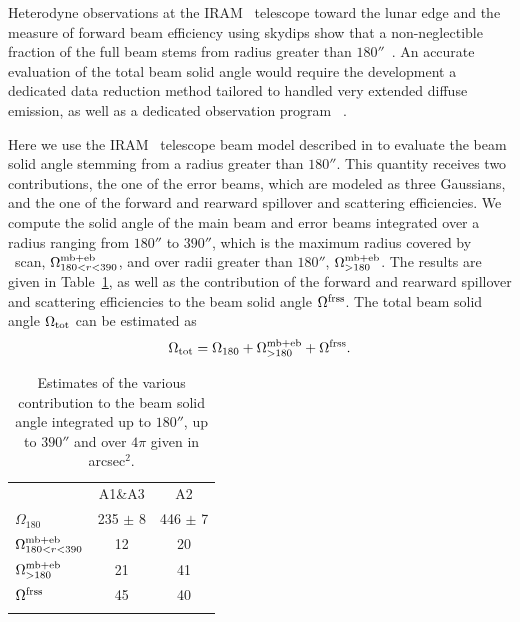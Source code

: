 Heterodyne observations at the IRAM \trentemetre\ telescope
toward the lunar edge and the measure of forward beam efficiency using
skydips show that a non-neglectible fraction of the full beam stems
from radius greater than $180''$~\citep{Greve1998, Kramer2013}.
An accurate evaluation of the total beam solid angle would require
{\lp the development a dedicated data reduction method tailored to
handled very extended diffuse emission,} as well as a 
dedicated observation program
~\citep{Greve1998, Sugimoto2004, Gusten2006}.
{\lp Here we use the IRAM \trentemetre\ telescope beam model described
in \citet{Kramer2013} to evaluate the beam solid angle stemming from a
radius greater than $180''$.
This quantity receives two contributions, the one of the error beams,
which are modeled as three Gaussians, and the one of the forward and
rearward spillover and scattering efficiencies. We compute the solid
angle of the main beam and error beams integrated over a radius ranging
from $180''$ to $390''$, which is the maximum radius covered by \bm\ scan,
$\Omega_{180<r<390}^{\rm{mb+eb}}$, and over radii greater
than $180''$, $\Omega_{>180}^{\rm{mb+eb}}$. The results are given in
Table~\ref{tab:solid_corr}, as well as the contribution of the forward and
rearward spillover and scattering efficiencies to the beam solid angle
$\Omega^{\rm{frss}}$. The total beam solid angle 
$\Omega_{\rm{tot}}$ can be estimated as
\begin{equation}
\Omega_{\rm{tot}} = \Omega_{180} + \Omega_{>180}^{\rm{mb+eb}}
+ \Omega^{\rm{frss}}.
\label{eq:omega_beam_4pi}
\end{equation}

\begin{table}[!h]
\caption{Estimates of the various contribution to the beam solid angle
integrated up to $180''$, up to $390''$ and over $4\pi$ given in
arcsec$^{2}$. }
\label{tab:solid_corr}
\centering
\begin{tabular}{lcc}
\hline\hline
\noalign{\smallskip}
&  A1\&A3 & A2 \\
\noalign{\smallskip}
\hline
\noalign{\smallskip}
$\Omega_{180}$                  &   235 $\pm$  8 & 446 $\pm$  7 \\\noalign{\smallskip}
$\Omega_{180<r<390}^{\rm{mb+eb}}$  &   12          &   20       \\\noalign{\smallskip}
$\Omega_{>180}^{\rm{mb+eb}}$      &   21          &   41      \\\noalign{\smallskip}
$\Omega^{\rm{frss}}$             &   45          &   40      \\
\noalign{\smallskip}
\hline
\end{tabular}
\end{table}
}

